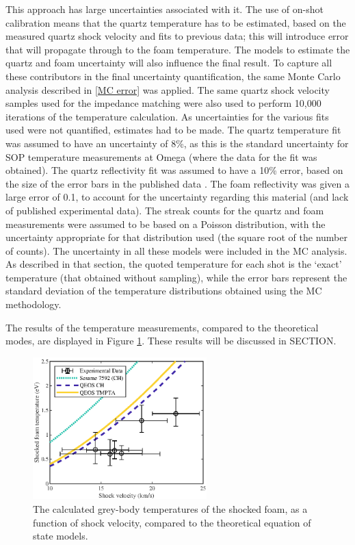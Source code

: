 This approach has large uncertainties associated with it. The use of on-shot calibration means that the quartz temperature has to be estimated, based on the measured quartz shock velocity and fits to previous data; this will introduce error that will propagate through to the foam temperature. The models to estimate the quartz and foam uncertainty will also influence the final result. To capture all these contributors in the final uncertainty quantification, the same Monte Carlo analysis described in \ref{MC error} was applied. The same quartz shock velocity samples used for the impedance matching were also used to perform 10,000 iterations of the temperature calculation. As uncertainties for the various fits used were not quantified, estimates had to be made. The quartz temperature fit was assumed to have an uncertainty of 8\%, as this is the standard uncertainty for SOP temperature measurements at Omega \cite{Millot2015} (where the data for the fit was obtained). The quartz reflectivity fit was assumed to have a 10\% error, based on the size of the error bars in the published data \cite{Millot2015}. The foam reflectivity was given a large error of 0.1, to account for the uncertainty regarding this material (and lack of published experimental data). The streak counts for the quartz and foam measurements were assumed to be based on a Poisson distribution, with the uncertainty appropriate for that distribution used (the square root of the number of counts). The uncertainty in all these models were included in the MC analysis. As described in that section, the quoted temperature for each shot is the `exact' temperature (that obtained without sampling), while the error bars represent the standard deviation of the temperature distributions obtained using the MC methodology.

The results of the temperature measurements, compared to the theoretical modes, are displayed in Figure \ref{fig:SOP Temp}. These results will be discussed in SECTION.

\begin{figure} [h!]
\begin{centering}
\includegraphics[width=0.6\textwidth]{figures/Experiment/Temp.eps}%
\caption{\label{fig:SOP Temp} The calculated grey-body temperatures of the shocked foam, as a function of shock velocity, compared to the theoretical equation of state models.}
\end{centering}
\end{figure}

